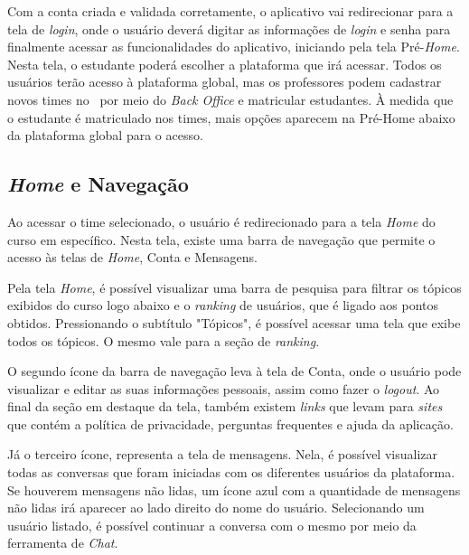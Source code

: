 Com a conta criada e validada corretamente, o aplicativo vai redirecionar para a tela de \textit{login}, onde o usuário deverá digitar as informações de \textit{login} e senha para finalmente acessar as funcionalidades do aplicativo, iniciando pela tela Pré-\textit{Home}. Nesta tela, o estudante poderá escolher a plataforma que irá acessar. Todos os usuários terão acesso à plataforma global, mas os professores podem cadastrar novos times no \appName\ por meio do \textit{Back Office} e matricular estudantes. À medida que o estudante é matriculado nos times, mais opções aparecem na Pré-Home abaixo da plataforma global para o acesso.

\subsection{\textit{Home} e Navegação}
\label{home_navegacao}

Ao acessar o time selecionado, o usuário é redirecionado para a tela \textit{Home} do curso em específico. Nesta tela, existe uma barra de navegação que permite o acesso às telas de \textit{Home}, Conta e Mensagens.


Pela tela \textit{Home}, é possível visualizar uma barra de pesquisa para filtrar os tópicos exibidos do curso logo abaixo e o \textit{ranking} de usuários, que é ligado aos pontos obtidos. Pressionando o subtítulo "Tópicos", é possível acessar uma tela que exibe todos os tópicos. O mesmo vale para a seção de \textit{ranking}.

O segundo ícone da barra de navegação leva à tela de Conta, onde o usuário pode visualizar e editar as suas informações pessoais, assim como fazer o \textit{logout}. Ao final da seção em destaque da tela, também existem \textit{links} que levam para \textit{sites} que contém a política de privacidade, perguntas frequentes e ajuda da aplicação.

Já o terceiro ícone, representa a tela de mensagens. Nela, é possível visualizar todas as conversas que foram iniciadas com os diferentes usuários da plataforma. Se houverem mensagens não lidas, um ícone azul com a quantidade de mensagens não lidas irá aparecer ao lado direito do nome do usuário. Selecionando um usuário listado, é possível continuar a conversa com o mesmo por meio da ferramenta de \textit{Chat}.

